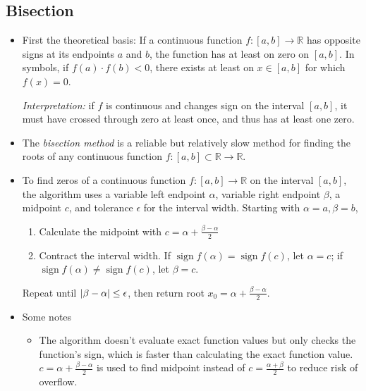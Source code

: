 \documentclass[11pt, a4paper]{article}
\newcommand{\R}{\mathbb{R}} %
\begin{document}
\subsection{Bisection}
\begin{itemize}
	\item First the theoretical basis: If a continuous function $ f:[a, b] \to \R $ has opposite signs at its endpoints $ a $ and $ b $, the function has at least on zero on $ [a, b] $. In symbols, if $ f(a)\cdot f(b) < 0 $, there exists at least on $ x \in [a, b] $ for which $ f(x) = 0 $.
	
	\textit{Interpretation:} if $ f $ is continuous and changes sign on the interval $ [a, b] $, it must have crossed through zero at least once, and thus has at least one zero.
	
	\item The \textit{bisection method} is a reliable but relatively slow method for finding the roots of any continuous function $ f : [a, b] \subset \R \to \R $. 
	
	\item To find zeros of a continuous function $ f: [a, b] \to \R $ on the interval $ [a, b] $, the algorithm uses a variable left endpoint $ \alpha $, variable right endpoint $ \beta $, a midpoint $ c $, and tolerance $ \epsilon $	for the interval width. Starting with $ \alpha = a, \beta = b $,
	\begin{enumerate}
		\item Calculate the midpoint with $ c = \alpha + \frac{\beta - \alpha}{2} $
		
		\item Contract the interval width. If $ \operatorname{sign}f(\alpha) = \operatorname{sign}f(c) $, let $ \alpha = c $; if $ \operatorname{sign}f(\alpha) \neq \operatorname{sign}f(c) $, let $ \beta = c $. 

	\end{enumerate}
	Repeat until $ \abs{\beta - \alpha} \leq \epsilon $, then return root $ x_{0} = \alpha + \frac{\beta - \alpha}{2} $.
	
	\item Some notes
	\begin{itemize}
	
		\item The algorithm doesn't evaluate exact function values but only checks the function's sign, which is faster than calculating the exact function value. $ c = \alpha + \frac{\beta - \alpha}{2} $ is used to find midpoint instead of $ c = \frac{\alpha + \beta}{2} $ to reduce risk of overflow.
		

\end{itemize}
\end{itemize}
\end{document}
